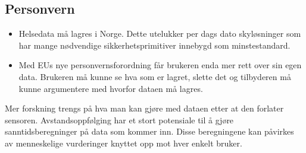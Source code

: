 \subsection{Personvern}

\begin{itemize}
  \item Helsedata må lagres i Norge. Dette utelukker per dags dato skyløsninger
  som har mange nødvendige sikkerhetsprimitiver innebygd som minstestandard.
  \item Med EUs nye personvernsforordning får brukeren enda mer rett over sin egen data.
  Brukeren må kunne se hva som er lagret, slette det og tilbyderen må kunne argumentere
  med hvorfor dataen må lagres.
\end{itemize}

Mer forskning trengs på hva man kan gjøre med dataen etter at den forlater sensoren.
Avstandsoppfølging har et stort potensiale til å gjøre sanntidsberegninger på data
som kommer inn. Disse beregningene kan påvirkes av menneskelige vurderinger knyttet
opp mot hver enkelt bruker.
